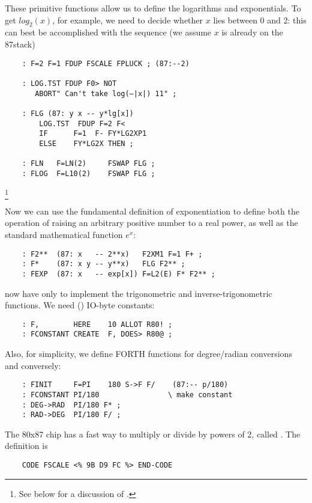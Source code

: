 These primitive functions allow us to define the logarithms and exponentials. To get $log_{2}(x)$, for example, we need to decide whether $x$ lies between 0 and 2: this can best be accomplished with
the sequence (we assume $x$ is already on the 87stack)

\begin{lstlisting}
    : F=2 F=1 FDUP FSCALE FPLUCK ; (87:--2)

    : LOG.TST FDUP F0> NOT
       ABORT" Can't take log(—|x|) 11" ;

    : FLG (87: y x -- y*lg[x])
        LOG.TST  FDUP F=2 F<
        IF      F=1  F- FY*LG2XP1
        ELSE    FY*LG2X THEN ;

    : FLN   F=LN(2)     FSWAP FLG ;
    : FLOG  F=L10(2)    FSWAP FLG ;
\end{lstlisting} \footnote{See below for a discussion of .}

Now we can use the fundamental definition of exponentiation to define both the operation of raising an arbitrary positive number to a real power, as well as the standard mathematical function $e^x$:

\begin{lstlisting}
    : F2**  (87: x   -- 2**x)   F2XM1 F=1 F+ ;
    : F*    (87: x y -- y**x)   FLG F2** ;
    : FEXP  (87: x   -- exp[x]) F=L2(E) F* F2** ;
\end{lstlisting}

 now have only to implement the trigonometric and inverse-trigonometric functions. We need () IO-byte constants:

\begin{lstlisting}
    : F,        HERE    10 ALLOT R80! ;
    : FCONSTANT CREATE  F, DOES> R80@ ;
\end{lstlisting}

Also, for simplicity, we define FORTH functions for degree/radian conversions and conversely:

\begin{lstlisting}
    : FINIT     F=PI    180 S->F F/    (87:-- p/180)
    : FCONSTANT PI/180                \ make constant
    : DEG->RAD  PI/180 F* ;
    : RAD->DEG  PI/180 F/ ;
\end{lstlisting}


The 80x87 chip has a fast way to multiply or divide by powers of 2, called . The  definition is

\begin{lstlisting}
    CODE FSCALE <% 9B D9 FC %> END-CODE
\end{lstlisting}

